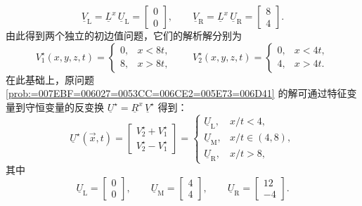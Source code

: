 \begin{equation}
\underline{V}_{\mathrm{L}}=\underline{L}^{x}\,\underline{U}_{\mathrm{L}}=\begin{bmatrix}0\\
0
\end{bmatrix},\qquad\underline{V}_{\mathrm{R}}=\underline{L}^{x}\,\underline{U}_{\mathrm{R}}=\begin{bmatrix}8\\
4
\end{bmatrix}.
\end{equation}
由此得到两个独立的初边值问题，它们的解析解分别为
\begin{equation}
V_{1}^{\star}(x,y,z,t)=\begin{cases}
0, & x<8t,\\
8, & x>8t,
\end{cases}\qquad V_{2}^{\star}(x,y,z,t)=\begin{cases}
0, & x<4t,\\
4, & x>4t.
\end{cases}
\end{equation}
在此基础上，原问题 \ref{prob:=007EBF=006027=0053CC=006CE2=005E73=006D41} 的解可通过特征变量到守恒变量的反变换
$\underline{U}^{\star}=\underline{R}^{x}\,\underline{V}^{\star}$
得到：
\begin{equation}
\underline{U}^{\star}(\vec{x},t)=\begin{bmatrix}V_{2}^{\star}+V_{1}^{\star}\\
V_{2}^{\star}-V_{1}^{\star}
\end{bmatrix}=\begin{cases}
\underline{U}_{\mathrm{L}}, & x/t<4,\\
\underline{U}_{\mathrm{M}}, & x/t\in(4,8),\\
\underline{U}_{\mathrm{R}}, & x/t>8,
\end{cases}\label{eq:linear_double_wave_solution}
\end{equation}
其中
\begin{equation}
\underline{U}_{\mathrm{L}}=\begin{bmatrix}0\\
0
\end{bmatrix},\qquad\underline{U}_{\mathrm{M}}=\begin{bmatrix}4\\
4
\end{bmatrix},\qquad\underline{U}_{\mathrm{R}}=\begin{bmatrix}12\\
-4
\end{bmatrix}.
\end{equation}

